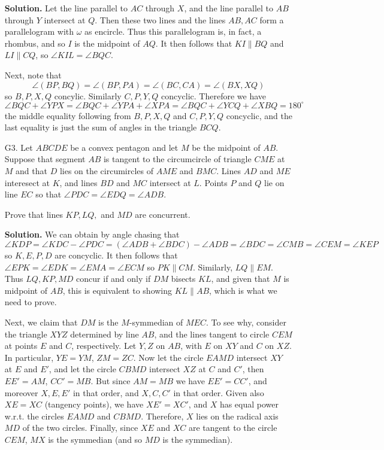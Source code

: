 \documentclass[11pt,a4paper]{article}
\begin{document}
\begin{enumerate}
    	\textbf{Solution.}
    	Let the line parallel to $AC$ through $X$, and the line parallel to $AB$ through $Y$ intersect at $Q$. 
    	Then these two lines and the lines $AB, AC$ form a parallelogram with $\omega$ as encircle. 
    	Thus this parallelogram is, in fact, a rhombus, 
    	and so $I$ is the midpoint of $AQ$. 
    	It then follows that $KI\parallel BQ$ and $LI\parallel CQ$, 
    	so $\angle KIL = \angle BQC$. 
    	
    	Next, note that 
    	\[
    	\angle (BP, BQ) = \angle (BP, PA)
    	=\angle (BC, CA) = \angle (BX, XQ)
    	\]
    	so $B, P, X, Q$ concylic. Similarly $C, P, Y, Q$ concyclic. 
    	Therefore we have 
    	\[
    	\angle BQC + \angle YPX
    	=\angle BQC + \angle YPA+\angle XPA
    	=\angle BQC + \angle YCQ+\angle XBQ
    	=180^{\circ}
    	\]
    	the middle equality following from $B, P, X, Q$ and $C, P, Y, Q$ concyclic, 
    	and the last equality is just the sum of angles in the triangle $BCQ$. 
    	
    	\item [G3.] 
    	Let $ABCDE$ be a convex pentagon and let $M$ be the midpoint of $AB$. Suppose that segment $AB$ is tangent to the circumcircle of triangle $CME$ at $M$ and that $D$ lies on the circumircles of $AME$ and $BMC$. Lines $AD$ and $ME$ interesect at $K$, and lines $BD$ and $MC$ intersect at $L$. Points $P$ and $Q$ lie on line $EC$ so that $\angle PDC = \angle EDQ = \angle ADB$.
    	
    	Prove that lines $KP, LQ,$ and $MD$ are concurrent.
    	
    	\textbf{Solution.} 
    	We can obtain by angle chasing that 
    	\[
    	\angle KDP
    	=\angle KDC - \angle PDC
    	=(\angle ADB + \angle BDC) - \angle ADB
    	=\angle BDC = \angle CMB = \angle CEM = \angle KEP
    	\]
    	so $K, E, P, D$ are concyclic. 
    	It then follows that $\angle EPK = \angle EDK = \angle EMA = \angle ECM$ so $PK\parallel CM$. 
    	Similarly, 
    	$LQ\parallel EM$. 
    	Thus $LQ, KP, MD$ concur if and only if $DM$ bisects $KL$, 
    	and given that $M$ is midpoint of $AB$, 
    	this is equivalent to showing $KL\parallel AB$, 
    	which is what we need to prove. 
    	
    	Next, we claim that $DM$ is the $M$-symmedian of $MEC$. 
    	To see why, consider the triangle $XYZ$ determined by line $AB$, and the lines tangent to circle $CEM$ at points $E$ and $C$, respectively. 
    	Let $Y, Z$ on $AB$, with $E$ on $XY$ and $C$ on $XZ$. 
    	In particular, $YE=YM$, $ZM=ZC$. 
    	Now let the circle $EAMD$ intersect $XY$ at $E$ and $E'$, 
    	and let the circle $CBMD$ intersect $XZ$ at $C$ and $C'$, then $EE'=AM$, $CC'=MB$. But since $AM=MB$ we have $EE'=CC'$, 
    	and moreover $X, E, E'$ in that order, and $X, C, C'$ in that order. 
    	Given also $XE=XC$ (tangency points), we have $XE'=XC'$, 
    	and $X$ has equal power w.r.t. the circles $EAMD$ and $CBMD$. 
    	Therefore, $X$ lies on the radical axis $MD$ of the two circles. 
    	Finally, since $XE$ and $XC$ are tangent to the circle $CEM$, 
    	$MX$ is the symmedian (and so $MD$ is the symmedian). 
    	

\end{enumerate}
\end{document}
